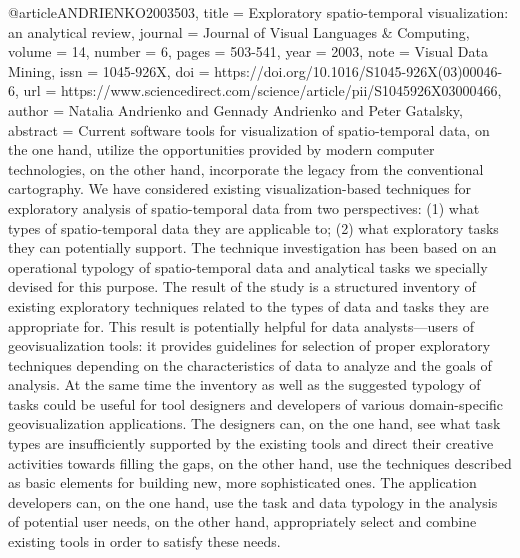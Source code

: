 @article{ANDRIENKO2003503,
title = {Exploratory spatio-temporal visualization: an analytical review},
journal = {Journal of Visual Languages & Computing},
volume = {14},
number = {6},
pages = {503-541},
year = {2003},
note = {Visual Data Mining},
issn = {1045-926X},
doi = {https://doi.org/10.1016/S1045-926X(03)00046-6},
url = {https://www.sciencedirect.com/science/article/pii/S1045926X03000466},
author = {Natalia Andrienko and Gennady Andrienko and Peter Gatalsky},
abstract = {Current software tools for visualization of spatio-temporal data, on the one hand, utilize the opportunities provided by modern computer technologies, on the other hand, incorporate the legacy from the conventional cartography. We have considered existing visualization-based techniques for exploratory analysis of spatio-temporal data from two perspectives: (1) what types of spatio-temporal data they are applicable to; (2) what exploratory tasks they can potentially support. The technique investigation has been based on an operational typology of spatio-temporal data and analytical tasks we specially devised for this purpose. The result of the study is a structured inventory of existing exploratory techniques related to the types of data and tasks they are appropriate for. This result is potentially helpful for data analysts—users of geovisualization tools: it provides guidelines for selection of proper exploratory techniques depending on the characteristics of data to analyze and the goals of analysis. At the same time the inventory as well as the suggested typology of tasks could be useful for tool designers and developers of various domain-specific geovisualization applications. The designers can, on the one hand, see what task types are insufficiently supported by the existing tools and direct their creative activities towards filling the gaps, on the other hand, use the techniques described as basic elements for building new, more sophisticated ones. The application developers can, on the one hand, use the task and data typology in the analysis of potential user needs, on the other hand, appropriately select and combine existing tools in order to satisfy these needs.}
}
